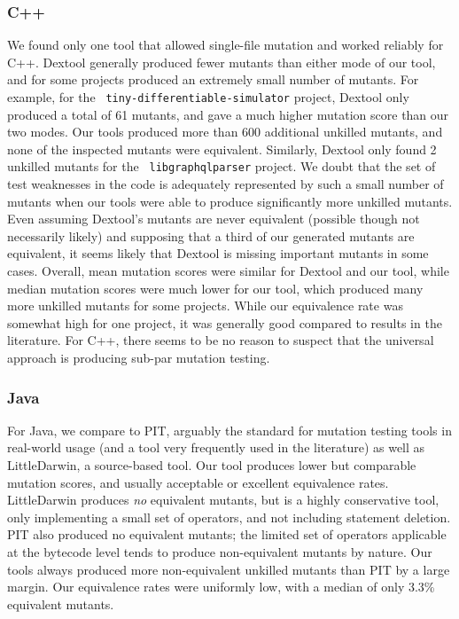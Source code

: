 \documentclass[acmsmall,screen,review,anonymous]{acmart}
\begin{document}
{\subsubsection{C++}

We found only one tool that allowed single-file mutation and worked
reliably for C++.  Dextool generally produced fewer mutants than
either mode of our tool, and for some projects produced an extremely
small number of mutants.  For example, for the {\tt
  tiny-differentiable-simulator} project, Dextool only produced a
total of 61 mutants, and gave a much higher mutation score than our
two modes.  Our tools produced more than 600 additional unkilled
mutants, and none of the inspected mutants were equivalent.
Similarly, Dextool only found 2 unkilled mutants for the {\tt
  libgraphqlparser} project.  We doubt that the set of test weaknesses
in the code is adequately represented by such a small number of
mutants when our tools were able to produce significantly more
unkilled mutants.  Even assuming Dextool's mutants are never
equivalent (possible though not necessarily likely) and supposing that a third of our
generated mutants are equivalent, it seems likely that Dextool is
missing important mutants in some cases.  Overall, mean mutation
scores were similar for Dextool and our tool, while
median mutation scores were much lower for our tool, which produced
many more unkilled mutants for some projects.  While our equivalence
rate was somewhat high for one project, it was generally good
compared to results in the literature.  For C++, there seems to
be no reason to suspect that the universal approach is producing
sub-par mutation testing.

\subsubsection{Java}

For Java, we compare to PIT, arguably the standard for mutation
testing tools in real-world usage (and a tool very frequently used in
the literature) as well as LittleDarwin, a source-based tool.  Our
tool produces lower but comparable mutation scores, and usually
acceptable or excellent equivalence rates.  LittleDarwin produces
\emph{no} equivalent mutants, but is a highly conservative tool, only
implementing a small set of operators, and not including statement
deletion.  PIT also produced no equivalent mutants; the limited set of
operators applicable at the bytecode level tends to produce
non-equivalent mutants by nature.  Our tools always produced more non-equivalent unkilled
mutants than PIT by a large margin.  Our equivalence rates were
uniformly low, with a median of only 3.3\% equivalent mutants.

}
\end{document}
